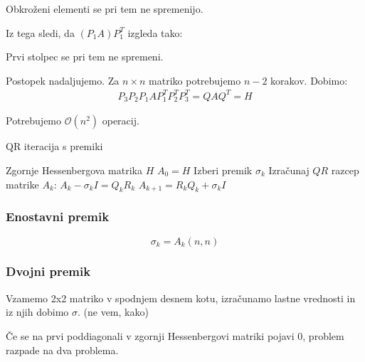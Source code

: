 \documentclass[a4paper,12pt]{article}
\theoremstyle{definition}
\theoremstyle{remark}
\newcounter{subsubsubsection}[subsubsection]
\begin{document}
Obkroženi elementi se pri tem ne spremenijo.

Iz tega sledi, da $(P_1 A) P_1^T$ izgleda tako:

\begin{center}
\end{center}

Prvi stolpec se pri tem ne spremeni.

Postopek nadaljujemo. Za $n \times n$ matriko potrebujemo $n-2$ korakov. Dobimo:
\begin{gather*}
    P_3 P_2 P_1 A P_1^T P_2^T P_3^T = Q A Q^T = H
\end{gather*}

Potrebujemo $\mathcal{O}(n^2)$ operacij.



\begin{algorithm}
    \caption{QR iteracija s premiki}
    \begin{algorithmic}[1]
    \Require Zgornje Hessenbergova matrika $H$
    \State $A_0 = H$
        \State Izberi premik $\sigma_k$
        \State Izračunaj $QR$ razcep matrike $A_k$: $A_k - \sigma_k I = Q_k R_k$
        \State $A_{k+1} = R_k Q_k + \sigma_k I$
    \EndWhile
    \end{algorithmic}
\end{algorithm}



\subsubsection*{Enostavni premik}
\begin{equation*}
    \sigma_k = A_k(n, n)
\end{equation*}

\subsubsection*{Dvojni premik}
Vzamemo 2x2 matriko v spodnjem desnem kotu, izračunamo lastne vrednosti in iz njih dobimo $\sigma$. (ne vem, kako)

Če se na prvi poddiagonali v zgornji Hessenbergovi matriki pojavi 0, problem razpade na dva problema.
\end{document}
